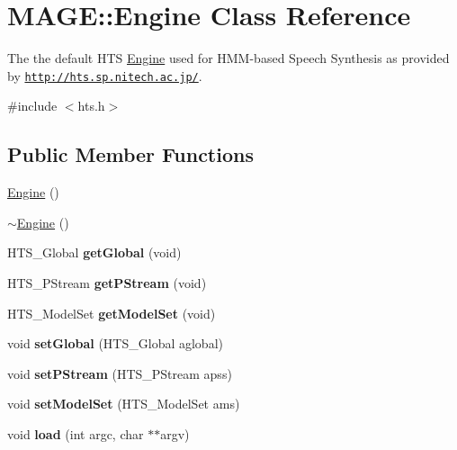 \hypertarget{class_m_a_g_e_1_1_engine}{\section{M\-A\-G\-E\-:\-:Engine Class Reference}
\label{class_m_a_g_e_1_1_engine}
}


The the default H\-T\-S \hyperlink{class_m_a_g_e_1_1_engine}{Engine} used for H\-M\-M-\/based Speech Synthesis as provided by \href{http://hts.sp.nitech.ac.jp/}{\tt http\-://hts.\-sp.\-nitech.\-ac.\-jp/}.  




{\ttfamily \#include $<$hts.\-h$>$}

\subsection*{Public Member Functions}
\begin{DoxyCompactItemize}
\item 
\hyperlink{class_m_a_g_e_1_1_engine_a7e1ba2c1d52e46a608ef884da134a4f4}{Engine} ()
\item 
\hyperlink{class_m_a_g_e_1_1_engine_a05d1b500a73cc6c671350c9d71ca81c9}{$\sim$\-Engine} ()
\item 
\hypertarget{class_m_a_g_e_1_1_engine_a7f5524bb3e6f55c6ee496fcd86923ca8}{H\-T\-S\-\_\-\-Global {\bfseries get\-Global} (void)}\label{class_m_a_g_e_1_1_engine_a7f5524bb3e6f55c6ee496fcd86923ca8}

\item 
\hypertarget{class_m_a_g_e_1_1_engine_acaab046109c999aa884245e5e8dd613a}{H\-T\-S\-\_\-\-P\-Stream {\bfseries get\-P\-Stream} (void)}\label{class_m_a_g_e_1_1_engine_acaab046109c999aa884245e5e8dd613a}

\item 
\hypertarget{class_m_a_g_e_1_1_engine_aaafb8884aeb03edb88f7b61f358a74ea}{H\-T\-S\-\_\-\-Model\-Set {\bfseries get\-Model\-Set} (void)}\label{class_m_a_g_e_1_1_engine_aaafb8884aeb03edb88f7b61f358a74ea}

\item 
\hypertarget{class_m_a_g_e_1_1_engine_a5a0940ccfcd254f4e26e1e4f7bac4352}{void {\bfseries set\-Global} (H\-T\-S\-\_\-\-Global aglobal)}\label{class_m_a_g_e_1_1_engine_a5a0940ccfcd254f4e26e1e4f7bac4352}

\item 
\hypertarget{class_m_a_g_e_1_1_engine_a6d9578d3142bd223e4f9a16b85c345ad}{void {\bfseries set\-P\-Stream} (H\-T\-S\-\_\-\-P\-Stream apss)}\label{class_m_a_g_e_1_1_engine_a6d9578d3142bd223e4f9a16b85c345ad}

\item 
\hypertarget{class_m_a_g_e_1_1_engine_a2c560516aed6235a6e97787581d20ab1}{void {\bfseries set\-Model\-Set} (H\-T\-S\-\_\-\-Model\-Set ams)}\label{class_m_a_g_e_1_1_engine_a2c560516aed6235a6e97787581d20ab1}

\item 
\hypertarget{class_m_a_g_e_1_1_engine_a06011d5cf59c57d195b47b03d37b5206}{void {\bfseries load} (int argc, char $\ast$$\ast$argv)}\label{class_m_a_g_e_1_1_engine_a06011d5cf59c57d195b47b03d37b5206}

\end{DoxyCompactItemize}
